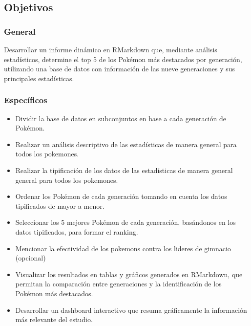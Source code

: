 \documentclass[
]{article}
\providecommand{\tightlist}{%
  \setlength{\itemsep}{0pt}\setlength{\parskip}{0pt}}
\begin{document}
\subsection{Objetivos}\label{objetivos}

\subsubsection{General}\label{general}

Desarrollar un informe dinámico en RMarkdown que, mediante análisis
estadísticos, determine el top 5 de los Pokémon más destacados por
generación, utilizando una base de datos con información de las nueve
generaciones y sus principales estadísticas.

\subsubsection{Específicos}\label{especuxedficos}

\begin{itemize}
\tightlist
\item
  Dividir la base de datos en subconjuntos en base a cada generación de
  Pokémon.
\item
  Realizar un análisis descriptivo de las estadísticas de manera general
  para todos los pokemones.
\item
  Realizar la tipificación de los datos de las estadísticas de manera
  general general para todos los pokemones.
\item
  Ordenar los Pokémon de cada generación tomando en cuenta los datos
  tipificados de mayor a menor.
\item
  Seleccionar los 5 mejores Pokémon de cada generación, basándonos en
  los datos tipificados, para formar el ranking.
\item
  Mencionar la efectividad de los pokemons contra los lideres de
  gimnacio (opcional)
\item
  Visualizar los resultados en tablas y gráficos generados en RMarkdown,
  que permitan la comparación entre generaciones y la identificación de
  los Pokémon más destacados.
\item
  Desarrollar un dashboard interactivo que resuma gráficamente la
  información más relevante del estudio.
\end{itemize}
\end{document}
